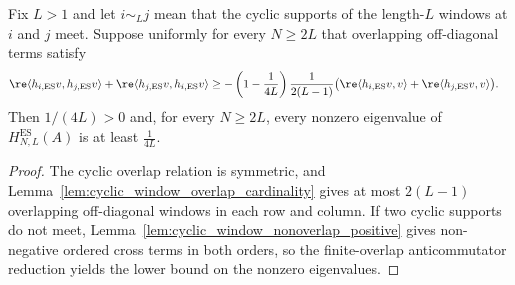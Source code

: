 \begin{lemma}
    \label{lem:parent_hamiltonian_cyclic_overlap_anticommutator_gap}
    \leanok
    Fix $L>1$ and let $i\sim_L j$ mean that the cyclic supports of the
    length-$L$ windows at $i$ and $j$ meet. Suppose uniformly for every
    $N\ge2L$ that overlapping off-diagonal terms satisfy
    \begin{align}
        \re\langle h_{i,\mathrm{ES}}v,h_{j,\mathrm{ES}}v\rangle
        +\re\langle h_{j,\mathrm{ES}}v,h_{i,\mathrm{ES}}v\rangle
         & \ge
        -\left(1-\frac{1}{4L}\right)\frac{1}{2(L-1)}
        \bigl(    \re\langle h_{i,\mathrm{ES}}v,v\rangle
        +\re\langle h_{j,\mathrm{ES}}v,v\rangle
        \bigr).
        \notag
    \end{align}
    Then $1/(4L)>0$ and, for every $N\ge2L$, every nonzero eigenvalue of
    $H_{N,L}^{\mathrm{ES}}(A)$ is at least $\frac{1}{4L}$.
\end{lemma}

\begin{proof}
    \leanok
    The cyclic overlap relation is symmetric, and
    Lemma~\ref{lem:cyclic_window_overlap_cardinality} gives at most $2(L-1)$
    overlapping off-diagonal windows in each row and column. If two cyclic
    supports do not meet, Lemma~\ref{lem:cyclic_window_nonoverlap_positive}
    gives non-negative ordered cross terms in both orders, so the
    finite-overlap anticommutator reduction yields the lower bound on the nonzero eigenvalues.
\end{proof}
